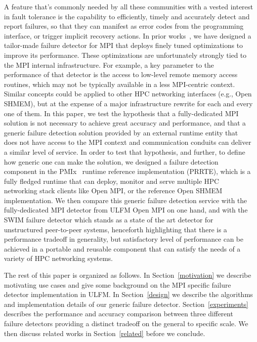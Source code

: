 \documentclass[sigconf]{acmart}
\begin{document}
A feature that's commonly needed by all these communities with a vested
interest in fault tolerance is the capability to efficiently, timely and
accurately detect and report failures, so that they can manifest as
error codes from the programming interface, or trigger implicit recovery
actions. In prior works~\cite{sc16}, we have designed a tailor-made
failure detector for MPI that deploys finely tuned optimizations to
improve its performance. These optimizations are unfortunately strongly
tied to the MPI internal infrastructure. For example, a key parameter to 
the performance of that detector is the
access to low-level remote memory access routines, which may not be typically
available in a less MPI-centric context. Similar concepts could be
applied to other HPC networking interfaces (e.g., Open SHMEM), but at 
the expense of a major infrastructure rewrite for each and every one of 
them. In this paper, we test the hypothesis that a fully-dedicated MPI 
solution is not necessary to achieve great accuracy and performance, and 
that a generic failure detection solution provided by an external runtime 
entity that does not have access to the MPI context and communication conduits
can deliver a similar level of service. In order to test that hypothesis, 
and further, to define how generic one can make the solution, we designed 
a failure detection component in the PMIx~\cite{pmix} runtime reference implementation
(PRRTE), which is a fully fledged runtime that can deploy, monitor and 
serve multiple HPC networking stack clients like Open MPI, or the 
reference Open SHMEM implementation. We then compare this generic 
failure detection service with the fully-dedicated MPI detector from 
ULFM Open MPI on one hand, and with the SWIM failure detector which stands 
as a state of the art detector for unstructured peer-to-peer systems, henceforth 
highlighting that there is a performance tradeoff in generality, but 
satisfactory level of performance can be achieved in a portable and reusable 
component that can satisfy the needs of a variety of HPC networking systems. 


The rest of this paper is organized as follows. In Section~\ref{motivation}
we describe motivating use cases and give some background on the MPI specific 
failure detector implementation in ULFM. In Section~\ref{design} we describe 
the algorithms and implementation details of our generic failure detector.
Section~\ref{experiments} describes the performance and accuracy comparison
between three different failure detectors providing a distinct tradeoff 
on the general to specific scale. We then discuss related works in 
Section~\ref{related} before we conclude.
\end{document}
